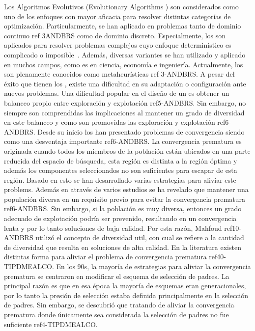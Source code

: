 Los Algoritmos Evolutivos (Evolutionary Algorithms \EA{}) son considerados como uno de los enfoques con mayor aficacia para resolver distintas categorías de optimización.
%
Particularmente, se han aplicado en problemas tanto de dominio continuo ref 3ANDBRS como de dominio discreto.
%
Especialmente, los \EAS{} son aplicados para resolver problemas complejos cuyo enfoque determinístico es complicado o imposible~\cite{chakraborty2008advances}.
% 
Además, diversas variantes se han utilizado y aplicado en muchos campos, como es en ciencia, economía e ingeniería.
%
%
Actualmente, los \EAS{} son plenamente conocidos como metaheurísticas ref 3-ANDBRS.
%
A pesar del éxito que tienen los \EAS{}, existe una dificultad en su adaptación o configuración ante nuevos problemas.
%
Una dificultad popular en el diseño de un \EA{} es obtener un balanceo propio entre exploración y explotación ref5-ANDBRS.
%
Sin embargo, no siempre son comprendidas las implicaciones al mantener un grado de diversidad en este balanceo y como son promovidas las exploración y explotación ref6-ANDBRS.
%
Desde su inicio los \EAS{} han presentado problemas de convergencia siendo como una desventaja importante ref6-ANDBRS.
%
La convergencia prematura es originada cuando todos los miembros de la población están ubicados en una parte reducida del espacio de búsqueda, esta región es distinta a la región óptima y además los componentes seleccionados no son suficientes para escapar de esta región.
%
Basado en esto se han desarrollado varias estrategias para aliviar este problems.
%
Además en através de varios estudios se ha revelado que mantener una populación diversa en un requisito previo para evitar la convergencia prematura ref6-ANDBRS.
%
Sin embargo, si la población es muy diversa, entonces un grado adecuado de explotación podría ser prevenido, resultando en un convergencia lenta y por lo tanto soluciones de baja calidad.
%
Por esta razón, Mahfoud ref10-ANDBRS utilizó el concepto de diversidad util, con cual se refiere a la cantidad de diversidad que resulta en soluciones de alta calidad.
%
En la literatura existen distintas forma para aliviar el problema de convergencia prematura ref40-TIPDMEALCO.
%
En los 90s, la mayoría de estrategias para aliviar la convergencia prematura se centraron en modificar el esquema de selección de padres.
%
La principal razón es que en esa época la mayoría de esquemas eran generacionales, por lo tanto la presión de selección estaba definida principalmente en la selección de padres.
%
Sin embargo, se descubrió que tratando de aliviar la convergencia prematura donde únicamente sea considerada la selección de padres no fue suficiente ref4-TIPDMEALCO.
